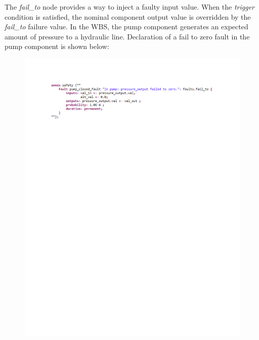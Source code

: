 The \textit{fail\_to} node provides a way to inject a faulty input value. When the \textit{trigger} condition is satisfied, the nominal component output value is overridden by the \textit{fail\_to} failure value. In the WBS, the pump component generates an expected amount of pressure to a hydraulic line.  Declaration of a fail to zero fault in the pump component is shown below:
\begin{figure}[h!]
	\hspace*{-3cm} 
	\vspace{-0.6in}
	\begin{center}
		\includegraphics[trim=60 620 0 60,clip,width=1.3\dimexpr\textwidth-1.5cm\relax]{images/pump_fault.pdf}
	\end{center}
	\vspace{-0.40in}
\end{figure}

